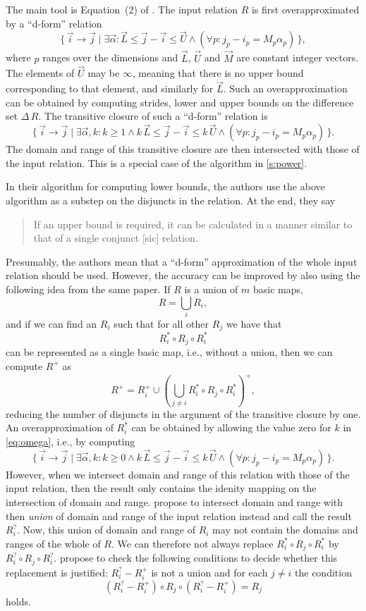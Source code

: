 The main tool is Equation~(2) of .
The input relation $R$ is first overapproximated by a ``d-form'' relation
$$
\{\, \vec i \to \vec j \mid \exists \vec \alpha :
\vec L \le \vec j - \vec i \le \vec U
\wedge
(\forall p : j_p - i_p = M_p \alpha_p)
\,\}
,
$$
where $p$ ranges over the dimensions and $\vec L$, $\vec U$ and
$\vec M$ are constant integer vectors.  The elements of $\vec U$
may be $\infty$, meaning that there is no upper bound corresponding
to that element, and similarly for $\vec L$.
Such an overapproximation can be obtained by computing strides,
lower and upper bounds on the difference set $\Delta \, R$.
The transitive closure of such a ``d-form'' relation is
\begin{equation}
\label{eq:omega}
\{\, \vec i \to \vec j \mid \exists \vec \alpha, k :
k \ge 1 \wedge
k \, \vec L \le \vec j - \vec i \le k \, \vec U
\wedge
(\forall p : j_p - i_p = M_p \alpha_p)
\,\}
.
\end{equation}
The domain and range of this transitive closure are then
intersected with those of the input relation.
This is a special case of the algorithm in \autoref{s:power}.

In their algorithm for computing lower bounds, the authors
use the above algorithm as a substep on the disjuncts in the relation.
At the end, they say
\begin{quote}
If an upper bound is required, it can be calculated in a manner
similar to that of a single conjunct [sic] relation.
\end{quote}
Presumably, the authors mean that a ``d-form'' approximation
of the whole input relation should be used.
However, the accuracy can be improved by also using the following
idea from the same paper.  If $R$ is a union of $m$ basic maps,
$$
R = \bigcup_i R_i
,
$$
and if we can find an $R_i$ such that for all other $R_j$ we have
that
$$
R_i^* \circ R_j \circ R_i^*
$$
can be represented as a single basic map, i.e., without a union,
then we can compute $R^+$ as
$$
R^+ = R_i^+ \cup
\left(
\bigcup_{j \ne i}
R_i^* \circ R_j \circ R_i^*
\right)^+
,
$$
reducing the number of disjuncts in the argument of the transitive
closure by one.
An overapproximation of $R_i^*$ can be obtained by
allowing the value zero for $k$ in \eqref{eq:omega},
i.e., by computing
$$
\{\, \vec i \to \vec j \mid \exists \vec \alpha, k :
k \ge 0 \wedge
k \, \vec L \le \vec j - \vec i \le k \, \vec U
\wedge
(\forall p : j_p - i_p = M_p \alpha_p)
\,\}
.
$$
However, when we intersect domain and range of this relation
with those of the input relation, then the result only contains
the idenity mapping on the intersection of domain and range.
 propose to intersect domain
and range with then {\em union} of domain and range of the input
relation instead and call the result $R_i^?$.
Now, this union of domain and range of $R_i$ may not contain
the domains and ranges of the whole of $R$.
We can therefore not always replace
$R_i^* \circ R_j \circ R_i^*$ by
$R_i^? \circ R_j \circ R_i^?$.
 propose to check the following
conditions to decide whether this replacement is justified:
$R_i^? - R_i^+$ is not a union and for each $j \ne i$
the condition
$$
\left(R_i^? - R_i^+\right)
\circ
R_j
\circ
\left(R_i^? - R_i^+\right)
=
R_j
$$
holds.
